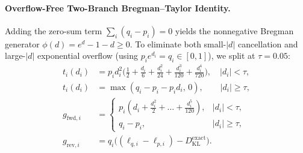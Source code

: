 \documentclass[10pt,twocolumn]{article}
\newcommand{\KL}{D_{\mathrm{KL}}}
\begin{document}
\paragraph{Overflow-Free Two-Branch Bregman--Taylor Identity.} Adding the zero-sum term $\sum_i (q_i - p_i) = 0$ yields the nonnegative Bregman generator $\phi(d) = e^d - 1 - d \ge 0$. To eliminate both small-$|d|$ cancellation and large-$|d|$ exponential overflow (using $p_i e^{d_i} = q_i \in [0,1]$), we split at $\tau = 0.05$:
\begin{align}
  t_i(d_i) &= p_i d_i^2 \big(\tfrac{1}{2} + \tfrac{d_i}{6} + \tfrac{d_i^2}{24} + \tfrac{d_i^3}{120} + \tfrac{d_i^4}{720}\big), \quad |d_i| < \tau, \label{eq:taylor} \\
  t_i(d_i) &= \max(q_i - p_i - p_i d_i,\, 0), \qquad |d_i| \ge \tau, \label{eq:exact} \\
  g_{\mathrm{fwd},i} &= \begin{cases} p_i (d_i + \tfrac{d_i^2}{2} + \dots + \tfrac{d_i^5}{120}), & |d_i| < \tau, \\ q_i - p_i, & |d_i| \ge \tau, \end{cases} \nonumber \\
  g_{\mathrm{rev},i} &= q_i\big((\ell_{q,i} - \ell_{p,i}) - \KL^{\mathrm{exact}}\big). \label{eq:grad}
\end{align}
\end{document}
